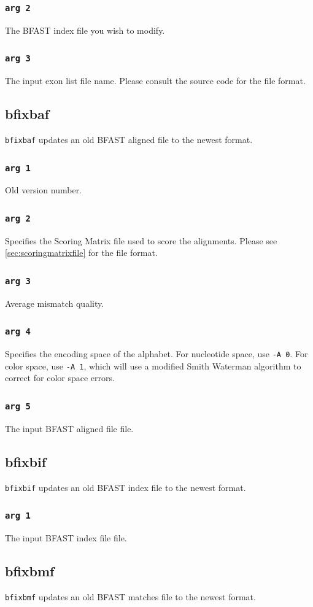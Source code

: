 \documentclass[a4paper,12pt]{book}
\newcommand{\TT}[1]{{\tt #1}} %
\newcommand{\BIF}{BFAST index file} %
\newcommand{\BMF}{BFAST matches file} %
\newcommand{\BAF}{BFAST aligned file} %
\begin{document}
\subsubsection{\TT{arg 2}}
The \BIF{} you wish to modify.

\subsubsection{\TT{arg 3}}
The input exon list file name. 
Please consult the source code for the file format.
\subsection{bfixbaf}
\label{sec:bfixbaf}
\TT{bfixbaf} updates an old \BAF{} to the newest format.
\subsubsection{\TT{arg 1}}
Old version number.
\subsubsection{\TT{arg 2}}
Specifies the Scoring Matrix file used to score the alignments.
Please see \autoref{sec:scoringmatrixfile} for the file format.
\subsubsection{\TT{arg 3}}
Average mismatch quality.
\subsubsection{\TT{arg 4}}
Specifies the encoding space of the alphabet.
For nucleotide space, use \TT{-A 0}.
For color space, use \TT{-A 1}, which will use a modified Smith Waterman algorithm to correct for color space errors.
\subsubsection{\TT{arg 5}}
The input \BAF{} file.
\subsection{bfixbif}
\label{sec:bfixbif}
\TT{bfixbif} updates an old \BIF{} to the newest format.
\subsubsection{\TT{arg 1}}
The input \BIF{} file.
\subsection{bfixbmf}
\label{sec:bfixbmf}
\TT{bfixbmf} updates an old \BMF{} to the newest format.
\end{document}
